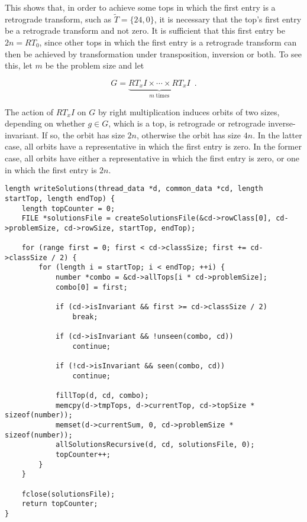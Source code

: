 \noindent This shows that, in order to achieve some tops in which the first entry is a retrograde transform, such as $\tilde{T} = \{24, 0\}$, it is necessary that the top's first entry be a retrograde transform and not zero. It is sufficient that this first entry be $2n = RT_0$, since other tops in which the first entry is a retrograde transform can then be achieved by transformation under transposition, inversion or both. To see this, let $m$ be the problem size and let

\begin{equation}
    G = \underbrace{RT_xI \times \cdots \times RT_xI}_{m \; \text{times}} \enspace.
\end{equation}

\vspace{12pt}

\noindent The action of $RT_xI$ on $G$ by right multiplication induces orbits of two sizes, depending on whether $g \in G$, which is a top, is retrograde or retrograde inverse-invariant. If so, the orbit has size $2n$, otherwise the orbit has size $4n$. In the latter case, all orbits have a representative in which the first entry is zero. In the former case, all orbits have either a representative in which the first entry is zero, or one in which the first entry is $2n$.

\begin{lstlisting}[caption={Writing a text file with all solutions for a row class within a range of tops.},label={writeSolutions}]
length writeSolutions(thread_data *d, common_data *cd, length startTop, length endTop) {
    length topCounter = 0;
    FILE *solutionsFile = createSolutionsFile(&cd->rowClass[0], cd->problemSize, cd->rowSize, startTop, endTop);

    for (range first = 0; first < cd->classSize; first += cd->classSize / 2) {
        for (length i = startTop; i < endTop; ++i) {
            number *combo = &cd->allTops[i * cd->problemSize];
            combo[0] = first;

            if (cd->isInvariant && first >= cd->classSize / 2)
                break;

            if (cd->isInvariant && !unseen(combo, cd))
                continue;

            if (!cd->isInvariant && seen(combo, cd))
                continue;

            fillTop(d, cd, combo);
            memcpy(d->tmpTops, d->currentTop, cd->topSize * sizeof(number));
            memset(d->currentSum, 0, cd->problemSize * sizeof(number));
            allSolutionsRecursive(d, cd, solutionsFile, 0);
            topCounter++;
        }
    }

    fclose(solutionsFile);
    return topCounter;
}
\end{lstlisting}

